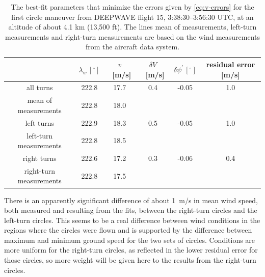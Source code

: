 \documentclass[12pt,twoside,english]{article}\usepackage[]{graphicx}\usepackage[]{color}
\providecommand{\tabularnewline}{\\}
\begin{document}
\begin{center}
\begin{table}[H] 
\begin{centering}
\begin{tabular}{cccccc}
\toprule   & $\lambda_w\,[^{\circ}]$  & $v$~{[}m/s{]}  & $\delta V$~{[}m/s{]}  & $\delta\psi^{\prime}\,[^{\circ}]$  & residual error {[}m/s{]}\tabularnewline 
\midrule 
\midrule  all turns & 222.8 & 17.7 & 0.4 & -0.05 & 1.0\tabularnewline 
\midrule  mean of measurements & 222.8 & 18.0 &  &  & \tabularnewline 
\midrule  left turns & 222.9 & 18.3 & 0.5 & -0.05 & 1.0\tabularnewline 
\midrule  left-turn measurements & 222.8 & 18.5 &  & & \tabularnewline 
\midrule  right turns & 222.6 & 17.2 & 0.3 & -0.06 & 0.4\tabularnewline 
\midrule  right-turn measurements & 222.8 & 17.5 &  & & \tabularnewline 
\bottomrule 
\end{tabular}
\par\end{centering}

\protect\caption[The best-fit parameters that minimize the errors given by \eqref{eq:v-errors} for the first circle maneuver from DEEPWAVE flight 15.]{The best-fit parameters that minimize the errors given by \eqref{eq:v-errors} for the first circle maneuver from DEEPWAVE flight 15, 3:38:30--3:56:30 UTC, at an altitude of about 4.1 km (13,500 ft). The lines \textquotedbl{}mean of measurements\textquotedbl{}, \textquotedbl{}left-turn measurements\textquotedbl{} and \textquotedbl{}right-turn measurements\textquotedbl{} are based on the wind measurements from the aircraft data system.\label{tab:GSmin}}
\end{table}

\par\end{center}

There is an apparently significant difference of about 1~m/s in mean wind speed, both measured and resulting from the fits, between the right-turn circles and the left-turn circles. This seems to be a real difference between wind conditions in the regions where the circles were flown and is supported by the difference between maximum and minimum ground speed for the two sets of circles. Conditions are more uniform for the right-turn circles, as reflected in the lower residual error for those circles, so more weight will be given here to the results from the right-turn circles. 
\end{document}
